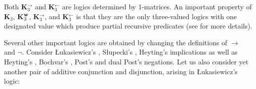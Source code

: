 \documentclass[11pt,a4paper,titlepage]{article}
\theoremstyle{definition}
\newcommand{\3}{\vspace{.3in}}
\newcommand{\2}{\vspace{.2in}}
\newcommand{\1}{\vspace{.1in}}
\newcommand{\5}{\vspace{.05in}}
\begin{document}
Both {\bf K$_3^\rightarrow$} and {\bf K$_3^\leftarrow$} are logics determined by 1-matrices. An important property of {\bf K$_3$}, {\bf K}$_3^{\bf w}$, {\bf K$_3^\rightarrow$}, and {\bf K$_3^\leftarrow$} is that they are the only three-valued logics with one designated value which produce partial recursive predicates (see \cite{Kleene,Komendantskaya} for more details).

Several other important logics are obtained by changing the definitions of $\rightarrow$ and $ \neg $. Consider \L ukasiewicz's \cite{Lukasiewicz}, S\l upecki's \cite{Slupecki67}, Heyting's \cite{Heyting} implications as well as Heyting's \cite{Heyting}, Bochvar's \cite{Bochvar}, Post's and dual Post's \cite{Post21} negations. Let us also consider yet another pair of additive conjunction and disjunction, arising in \L ukasiewicz's logic:
\end{document}
